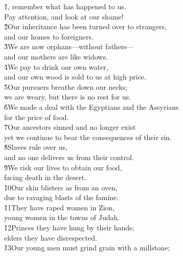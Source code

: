 \begin{poetry}
\poeml {}
\v{1}, remember what has happened to us. \\
\poemll    Pay attention, and look at our shame! \\
\poeml \v{2}Our inheritance has been turned over to strangers, \\
\poemll    and our homes to foreigners. \\
\poeml \v{3}We are now orphans---without fathers--- \\
\poemll    and our mothers are like widows. \\
\poeml \v{4}We pay to drink our own water, \\
\poemll    and our own wood is sold to us at high price. \\
\poeml \v{5}Our pursuers breathe down our necks; \\
\poemll    we are weary, but there is no rest for us. \\
\poeml \v{6}We made a deal with the Egyptians and the Assyrians \\
\poemll    for the price of food. \\
\poeml \v{7}Our ancestors sinned and no longer exist \\
\poemll    yet we continue to bear the consequences of their sin. \\
\poeml \v{8}Slaves rule over us, \\
\poemll    and no one delivers us from their control. \\
\poeml \v{9}We risk our lives to obtain our food, \\
\poemll    facing death in the desert. \\
\poeml \v{10}Our skin blisters as from an oven, \\
\poemll    due to ravaging blasts of the famine. \\
\poeml \v{11}They have raped women in Zion, \\
\poemll    young women in the towns of Judah. \\
\poeml \v{12}Princes they have hung by their hands; \\
\poemll    elders they have disrespected. \\
\poeml \v{13}Our young men must grind grain with a millstone; \\

\end{poetry}
